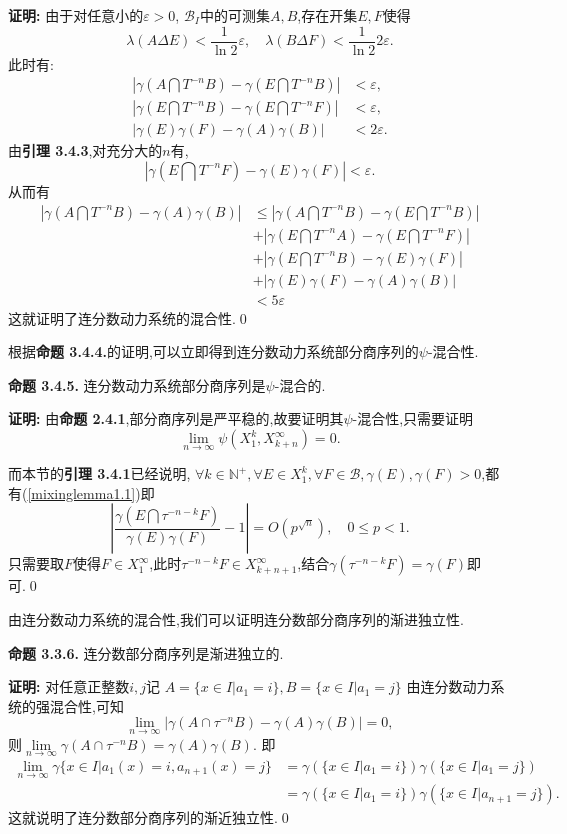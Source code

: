 \textbf{证明:  }
由于对任意小的$\varepsilon>0$, $\mathcal{B}_I$中的可测集$A,B$,存在开集$E,F$使得$$\lambda(A\Delta E)<\frac{1}{\ln 2}\varepsilon,\quad \lambda(B\Delta F)<\frac{1}{\ln 2}2\varepsilon.$$
此时有:
\begin{align*}
    |\gamma(A\bigcap T^{-n}B)-\gamma(E\bigcap T^{-n}B)|&<\varepsilon,\\
    |\gamma(E\bigcap T^{-n}B)-\gamma(E\bigcap T^{-n}F)|&<\varepsilon,\\
    |\gamma(E)\gamma(F)-\gamma(A)\gamma(B)|&<2\varepsilon.
\end{align*}
由\textbf{引理 3.4.3},对充分大的$n$有,
$$|\gamma(E\bigcap T^{-n}F)-\gamma(E)\gamma(F)|<\varepsilon.$$
从而有
\begin{align*}
|\gamma(A\bigcap T^{-n}B)-\gamma(A)\gamma(B)|& \leqslant|\gamma(A\bigcap T^{-n}B)-\gamma(E\bigcap T^{-n}B)|\\
&+|\gamma(E\bigcap T^{-n}A)-\gamma(E\bigcap T^{-n}F)| \\
&+|\gamma(E\bigcap T^{-n}B)-\gamma(E)\gamma(F)| \\
&+|\gamma(E)\gamma(F)-\gamma(A)\gamma(B)|\\
&<5\varepsilon
\end{align*}
这就证明了连分数动力系统的混合性.\qed
\par
根据\textbf{命题 3.4.4.}的证明,可以立即得到连分数动力系统部分商序列的$\psi$-混合性.\par
\textbf{命题 3.4.5.  }\textsuperscript{\cite{Partial_quotients,Mixing}}
连分数动力系统部分商序列是$\psi$-混合的.
\par
\textbf{证明:  }
由\textbf{命题 2.4.1},部分商序列是严平稳的,故要证明其$\psi$-混合性,只需要证明
$$\lim_{n\to\infty}\psi(X_{1}^{k},X_{k+n}^{\infty})=0.$$\par
而本节的\textbf{引理 3.4.1}已经说明, $\forall k\in\mathbb{N^+},\forall E\in X_{1}^{k},\forall F\in \mathcal{B},\gamma(E),\gamma(F)>0$,都有(\ref{mixinglemma1.1})即
$$\left|\frac{\gamma(E\bigcap \tau^{-n-k}F)}{\gamma(E)\gamma(F)}-1\right|=O(p^{\sqrt{n}}),\quad 0\leqslant p<1.$$
只需要取$F$使得$F\in X_{1}^{\infty}$,此时$\tau^{-n-k}F\in X_{k+n+1}^{\infty}$,结合$\gamma(\tau^{-n-k}F)=\gamma(F)$即可.\qed
\par
由连分数动力系统的混合性,我们可以证明连分数部分商序列的渐进独立性.\par
\textbf{命题 3.3.6.  }\textsuperscript{\cite{Liu_Peng}}
连分数部分商序列是渐进独立的.
\par
\textbf{证明:  }
对任意正整数$i,j$记
$A=\{x\in I|a_1=i\},B=\{x\in I|a_1=j\}$
由连分数动力系统的强混合性,可知
$$\lim\limits_{n\to \infty}\left|\gamma(A\cap\tau^{-n}B)-\gamma(A)\gamma(B)\right|=0,$$
则$\lim\limits_{n\to \infty}\gamma(A\cap\tau^{-n}B)=\gamma(A)\gamma(B).$
即
\begin{align*}
\lim\limits_{n\to \infty}\gamma\{x\in I|a_1(x)=i,a_{n+1}(x)=j\}&=\gamma(\{x\in I|a_1=i\})\gamma(\{x\in I|a_1=j\})\\
&=\gamma(\{x\in I|a_1=i\})\gamma(\{x\in I|a_{n+1}=j\}).
\end{align*}
这就说明了连分数部分商序列的渐近独立性.\qed

\sectionbreak
